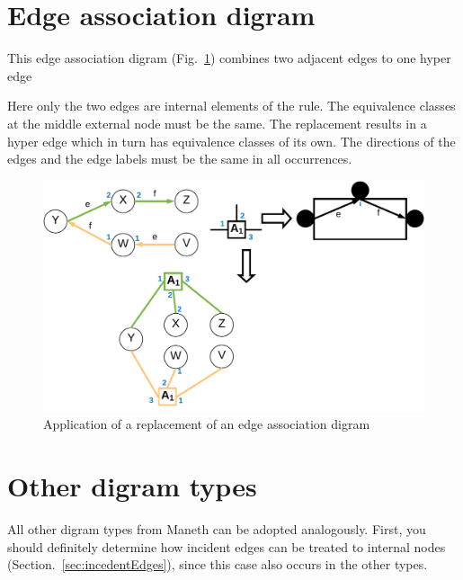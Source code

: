 \documentclass[a4paper]{scrartcl}
\begin{document}
\section{Edge association digram}
\label{sec:edgeAssociationDigram}


This edge association digram (Fig.~\ref{fig:edgeAssociationDigram}) combines two adjacent edges to one hyper edge

Here only the two edges are internal elements of the rule. The equivalence classes at the middle external node must be the same. The replacement results in a hyper edge which in turn has equivalence classes of its own. The directions of the edges and the edge labels must be the same in all occurrences.
\begin{figure}[h]
	\centering
	\includegraphics[width=1\textwidth]{img/edgeAssociationDigram}
	\caption{Application of a replacement of an edge association digram}
	\label{fig:edgeAssociationDigram}
\end{figure}

\section{Other digram types}
All other digram types from Maneth can be adopted analogously. First, you should definitely determine how incident edges can be treated to internal nodes (Section.~\ref{sec:incedentEdges}), since this case also occurs in the other types.


\pagebreak
\end{document}
